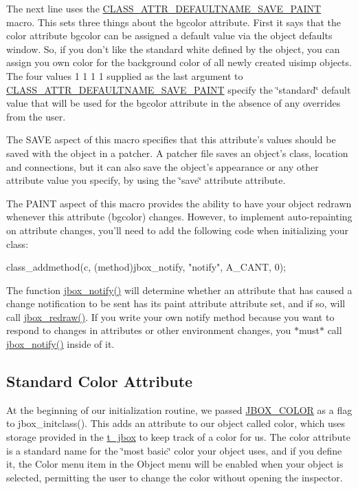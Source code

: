 The next line uses the \hyperlink{group__attr_gaa341fe624851ca5eda03361822bb5e33}{CLASS\_\-ATTR\_\-DEFAULTNAME\_\-SAVE\_\-PAINT} macro. This sets three things about the bgcolor attribute. First it says that the color attribute bgcolor can be assigned a default value via the object defaults window. So, if you don't like the standard white defined by the object, you can assign you own color for the background color of all newly created uisimp objects. The four values 1 1 1 1 supplied as the last argument to \hyperlink{group__attr_gaa341fe624851ca5eda03361822bb5e33}{CLASS\_\-ATTR\_\-DEFAULTNAME\_\-SAVE\_\-PAINT} specify the \char`\"{}standard\char`\"{} default value that will be used for the bgcolor attribute in the absence of any overrides from the user.

The SAVE aspect of this macro specifies that this attribute's values should be saved with the object in a patcher. A patcher file saves an object's class, location and connections, but it can also save the object's appearance or any other attribute value you specify, by using the \char`\"{}save\char`\"{} attribute attribute.

The PAINT aspect of this macro provides the ability to have your object redrawn whenever this attribute (bgcolor) changes. However, to implement auto-\/repainting on attribute changes, you'll need to add the following code when initializing your class:


\begin{DoxyCode}
    class_addmethod(c, (method)jbox_notify, "notify", A_CANT, 0);
\end{DoxyCode}


The function \hyperlink{group__jbox_ga9aa791abf47ea1cb276c5a867665a52a}{jbox\_\-notify()} will determine whether an attribute that has caused a change notification to be sent has its paint attribute attribute set, and if so, will call \hyperlink{group__jbox_ga92b553f8adc9994553590bbbcfd7e49d}{jbox\_\-redraw()}. If you write your own notify method because you want to respond to changes in attributes or other environment changes, you $\ast$must$\ast$ call \hyperlink{group__jbox_ga9aa791abf47ea1cb276c5a867665a52a}{jbox\_\-notify()} inside of it.\hypertarget{chapter_ui_anatomy_chapter_ui_anatomy_attributes_color}{}\subsection{Standard Color Attribute}\label{chapter_ui_anatomy_chapter_ui_anatomy_attributes_color}
At the beginning of our initialization routine, we passed \hyperlink{group__jbox_ga14cb28210886cfe0df0c34f71338faf8}{JBOX\_\-COLOR} as a flag to jbox\_\-initclass(). This adds an attribute to our object called color, which uses storage provided in the \hyperlink{structt__jbox}{t\_\-jbox} to keep track of a color for us. The color attribute is a standard name for the \char`\"{}most basic\char`\"{} color your object uses, and if you define it, the Color menu item in the Object menu will be enabled when your object is selected, permitting the user to change the color without opening the inspector.

